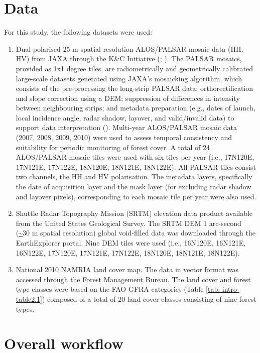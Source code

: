 \section{Data}
\label{sec: method-data}

For this study, the following datasets were used:

\begin{enumerate}
	\item Dual-polarised 25 m spatial resolution ALOS/PALSAR mosaic data (HH, HV) from JAXA through the K\&C Initiative (\cite{rosenqvist_initiating_2001}; \cite{rosenqvist_kyoto_2010}). The PALSAR mosaics, provided as 1x1 degree tiles, are radiometrically and geometrically calibrated large-scale datasets generated using JAXA's mosaicking algorithm, which consists of the pre-processing the long-strip PALSAR data; orthorectification and slope correction using a DEM; suppression of differences in intensity between neighbouring strips; and metadata preparation (e.g., dates of launch, local incidence angle, radar shadow, layover, and valid/invalid data) to support data interpretation (\cite{shimada_generating_2010}).
	Multi-year ALOS/PALSAR mosaic data (2007, 2008, 2009, 2010) were used to assess temporal consistency and suitability for periodic monitoring of forest cover. A total of 24 ALOS/PALSAR mosaic tiles were used with six tiles per year (i.e., 17N120E, 17N121E, 17N122E, 18N120E, 18N121E, 18N122E). All PALSAR tiles consist two channels, the HH and HV polarisation. The metadata layers, specifically the date of acquisition layer and the mask layer (for excluding radar shadow and layover pixels), corresponding to each mosaic tile per year were also used.
	\item Shuttle Radar Topography Mission (SRTM) elevation data product available from the United States Geological Survey. The SRTM DEM 1 arc-second (\url{~}30 m spatial resolution) global void-filled data was downloaded through the EarthExplorer portal. Nine DEM tiles were used (i.e., 16N120E, 16N121E, 16N122E, 17N120E, 17N121E, 17N122E, 18N120E, 18N121E, 18N122E).
	\item National 2010 NAMRIA land cover map. The data in vector format was accessed through the Forest Management Bureau. The land cover and forest type classes were based on the FAO GFRA categories (Table \ref{tab: intro-table2.1}) composed of a total of 20 land cover classes consisting of nine forest types.
\end{enumerate}

\section{Overall workflow}
\label{sec: method-overall-workflow}

